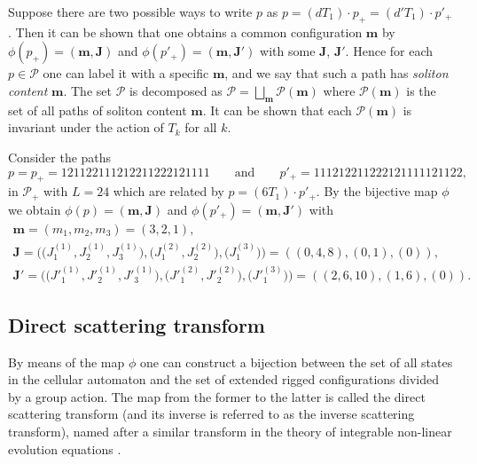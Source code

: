\documentclass[11pt]{article}
\newcommand{\Pth}{{\mathcal P}}
\newcommand{\m}{{\boldsymbol m}}
\newcommand{\boJ}{{\boldsymbol J}}
\begin{document}
Suppose there are two possible ways to write $p$ as $p =(d T_1) \cdot p_+ = (d' T_1) \cdot p'_+$.
Then it can be shown that
one obtains a common conf\/iguration $\m$ by $\phi (p_+) = (\m,\boJ)$ and $\phi (p'_+) = (\m,\boJ')$ with some $\boJ$, $\boJ'$.
Hence for each $p \in {\mathcal P}$ one can label it with a specif\/ic $\m$, and we say that such a path has {\em soliton content} $\m$.
The set ${\mathcal P}$ is decomposed as ${\mathcal P} = \bigsqcup_{\m} {\mathcal P}(\m)$
where ${\mathcal P}(\m)$ is the set of all paths of soliton content $\m$.
It can be shown that each ${\mathcal P}(\m)$ is
invariant under the action of $T_k$ for all $k$.

\begin{example}\label{ex:oct16_1}
Consider the paths
\begin{equation*}
p=p_+=121122111212211222121111 \qquad \mbox{and} \qquad p'_+=111212211222121111121122,
\end{equation*}
in $\Pth_+$ with $L=24$ which are related by
$p = (6 T_1) \cdot p'_+$.
By the bijective map $\phi$
we obtain
$\phi (p) = (\m, \boJ)$ and $\phi (p'_+) = (\m, \boJ')$
with
\begin{gather*}
\m  = (m_1, m_2, m_3) = (3,2,1),\\
\boJ  = \big(\big(J^{(1)}_1,J^{(1)}_2,J^{(1)}_3\big),\big(J^{(2)}_1,J^{(2)}_2\big),\big(J^{(3)}_1\big)\big) = ((0,4,8),(0,1),(0)),\\
\boJ'  = \big(\big(J'^{(1)}_1,J'^{(1)}_2,J'^{(1)}_3\big),\big(J'^{(2)}_1,J'^{(2)}_2\big),\big(J'^{(3)}_1\big)\big) = ((2,6,10),(1,6),(0)).
\end{gather*}
\end{example}


\subsection{Direct scattering transform}\label{subsec:4_3}

By means of the map $\phi$ one can construct a bijection between the set of
all states in the cellular automaton and the set of extended rigged conf\/igurations divided by a group action.
The map from the former to the latter is called the direct scattering transform
(and its inverse is referred to as the inverse scattering transform),
named after a similar transform in the theory of integrable non-linear evolution equations \cite{AS}.
\end{document}
